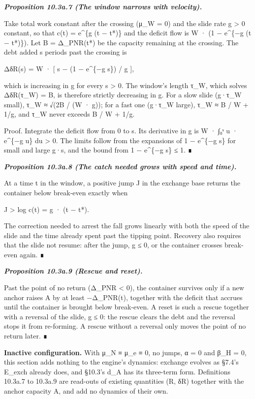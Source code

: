 \documentclass[
]{article}
\begin{document}
\emph{\textbf{Proposition 10.3a.7 (The window narrows with velocity).}}

Take total work constant after the crossing (μ\_W = 0) and the slide
rate g \textgreater{} 0 constant, so that c(t) = e\^{}\{g (t − t*)\} and
the deficit flow is W · (1 − e\^{}\{−g (t − t*)\}). Let B = Δ\_PNR(t*)
be the capacity remaining at the crossing. The debt added s periods past
the crossing is

ΔδR(s) = W · {[} s − (1 − e\^{}\{−g s\}) / g {]},

which is increasing in g for every s \textgreater{} 0. The window's
length τ\_W, which solves ΔδR(τ\_W) = B, is therefore strictly
decreasing in g. For a slow slide (g·τ\_W small), τ\_W ≈ √(2B / (W ·
g)); for a fast one (g·τ\_W large), τ\_W ≈ B / W + 1/g, and τ\_W never
exceeds B / W + 1/g.

Proof. Integrate the deficit flow from 0 to s. Its derivative in g is W
· ∫₀ˢ u · e\^{}\{−g u\} du \textgreater{} 0. The limits follow from the
expansions of 1 − e\^{}\{−g s\} for small and large g·s, and the bound
from 1 − e\^{}\{−g s\} ≤ 1. ∎

\emph{\textbf{Proposition 10.3a.8 (The catch needed grows with speed and
time).}}

At a time t in the window, a positive jump J in the exchange base
returns the container below break-even exactly when

J \textgreater{} log c(t) = g · (t − t*).

The correction needed to arrest the fall grows linearly with both the
speed of the slide and the time already spent past the tipping point.
Recovery also requires that the slide not resume: after the jump, g ≤ 0,
or the container crosses break-even again. ∎

\emph{\textbf{Proposition 10.3a.9 (Rescue and reset).}}

Past the point of no return (Δ\_PNR \textless{} 0), the container
survives only if a new anchor raises A by at least −Δ\_PNR(t), together
with the deficit that accrues until the container is brought below
break-even. A reset is such a rescue together with a reversal of the
slide, g ≤ 0: the rescue clears the debt and the reversal stops it from
re-forming. A rescue without a reversal only moves the point of no
return later. ∎

\textbf{Inactive configuration.} With μ\_N ≡ μ\_e ≡ 0, no jumps, α = 0
and β\_H = 0, this section adds nothing to the engine's dynamics:
exchange evolves as §7.4's E\_exch already does, and §10.3's d\_A has
its three-term form. Definitions 10.3a.7 to 10.3a.9 are read-outs of
existing quantities (R, δR) together with the anchor capacity A, and add
no dynamics of their own.
\end{document}
